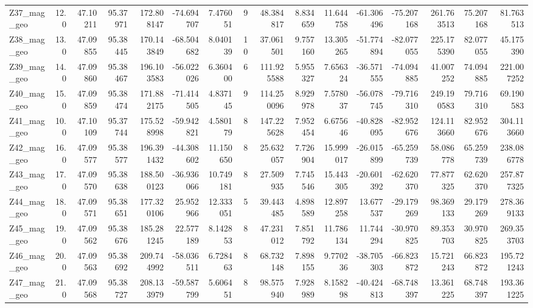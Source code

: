 \documentclass[11pt]{article}
\begin{document}
\begin{sidewaystable}
{\begin{tabular}{lrrrrrrrrrrrrrrr}
Z37\_mag\_geo &       12.0 &  47.10211 &  95.37971 &  172.808147 & -74.694707 &   7.476051 &   9 &   48.384817 &  8.834659 &  11.644758 &     -61.306496 & -75.207168 &  261.763513 &    75.207168 &    81.763513 \\
Z38\_mag\_geo &       13.0 &  47.09855 &  95.38445 &  170.143849 & -68.504682 &   8.040139 &  10 &   37.061501 &  9.757160 &  13.305265 &     -51.774894 & -82.077055 &  225.175390 &    82.077055 &    45.175390 \\
Z39\_mag\_geo &       14.0 &  47.09860 &  95.38467 &  196.103583 & -56.022026 &   6.360400 &   6 &  111.925588 &  5.955327 &   7.656324 &     -36.571555 & -74.094885 &   41.007252 &    74.094885 &   221.007252 \\
Z40\_mag\_geo &       15.0 &  47.09859 &  95.38474 &  171.882175 & -71.414505 &   4.837145 &   9 &  114.250096 &  8.929978 &   7.578037 &     -56.078745 & -79.716310 &  249.190583 &    79.716310 &    69.190583 \\
Z41\_mag\_geo &       10.0 &  47.10109 &  95.37744 &  175.528998 & -59.942821 &   4.580179 &   8 &  147.225628 &  7.952454 &   6.675646 &     -40.828095 & -82.952676 &  124.113660 &    82.952676 &   304.113660 \\
Z42\_mag\_geo &       16.0 &  47.09577 &  95.38577 &  196.391432 & -44.308602 &  11.150650 &   8 &   25.632057 &  7.726904 &  15.999017 &     -26.015899 & -65.259739 &   58.086778 &    65.259739 &   238.086778 \\
Z43\_mag\_geo &       17.0 &  47.09570 &  95.38638 &  188.500123 & -36.936066 &  10.749181 &   8 &   27.509935 &  7.745546 &  15.443305 &     -20.601392 & -62.620370 &   77.877325 &    62.620370 &   257.877325 \\
Z44\_mag\_geo &       18.0 &  47.09571 &  95.38651 &  177.320106 &  25.952966 &  12.333051 &   5 &   39.443485 &  4.898589 &  12.897258 &      13.677537 & -29.179269 &   98.369133 &    29.179269 &   278.369133 \\
Z45\_mag\_geo &       19.0 &  47.09562 &  95.38676 &  185.281245 &  22.577189 &   8.142853 &   8 &   47.231012 &  7.851792 &  11.786134 &      11.744294 & -30.970825 &   89.353703 &    30.970825 &   269.353703 \\
Z46\_mag\_geo &       20.0 &  47.09563 &  95.38692 &  209.744992 & -58.036511 &   6.728463 &   8 &   68.732148 &  7.898155 &   9.770236 &     -38.705303 & -66.823872 &   15.721243 &    66.823872 &   195.721243 \\
Z47\_mag\_geo &       21.0 &  47.09568 &  95.38727 &  208.133979 & -59.587799 &   5.606451 &   8 &   98.575940 &  7.928989 &   8.158298 &     -40.424813 & -68.748397 &   13.361225 &    68.748397 &   193.361225 \\

\end{tabular}}
\end{sidewaystable}
\end{document}
